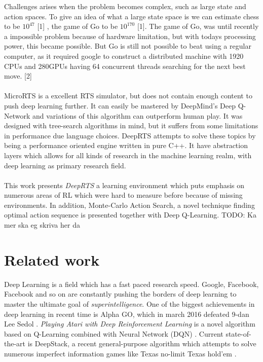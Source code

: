 \documentclass[fleqn,10pt]{article} %
\newcommand{\todo}[1]{}
\renewcommand{\todo}[1]{{\color{red} TODO: {#1}}}
\begin{document}
Challenges arises when the problem becomes complex, such as large state and action spaces. To give an idea of what a large state space is we can estimate chess to be $10^{47}$ [1] , the game of Go to be $10^{170}$ [1]. The game of Go, was until recently a impossible problem because of hardware limitation, but with todays processing power, this became possible. But Go is still not possible to beat using a regular computer, as it required google to construct a distributed machine with 1920 CPUs and 280GPUs having 64 concurrent threads  searching for the next best move. [2]
\\
\\
MicroRTS is a excellent RTS simulator, but does not contain enough content to push deep learning further. It can easily be mastered by DeepMind's Deep Q-Network and variations of this algorithm can outperform human play. It was designed with tree-search algorithms in mind, but it suffers from some limitations in performance due language choices. DeepRTS attempts to solve these topics by being a performance oriented engine written in pure C++. It have abstraction layers which allows for all kinds of research in the machine learning realm, with deep learning as primary research field.
\\
\\
This work presents \textit{DeepRTS} a learning environment which puts emphasis on numerous areas of RL which were hard to measure before because of missing environments. In addition, Monte-Carlo Action Search, a novel technique finding optimal action sequence is presented together with Deep Q-Learning.
 \todo{Ka mer ska eg skriva her da}
\section{Related work} %




Deep Learning is a field which has a fast paced research speed. Google, Facebook, Facebook and so on are constantly pushing the borders of deep learning to master the ultimate goal of \textit{superintelligence}. One of the biggest achievements in deep learning in recent time is Alpha GO, which in march 2016 defeated 9-dan Lee Sedol \cite{Silver_2016}. \textit{Playing Atari with Deep Reinforcement Learning} is a novel algorithm based on Q-Learning combined with Neural Network (DQN) \cite{DBLP:journals/corr/MnihKSGAWR13}. Current state-of-the-art is DeepStack, a recent general-purpose algorithm which attempts to solve numerous imperfect information games like Texas no-limit Texas hold’em \cite{DBLP:journals/corr/MoravcikSBLMBDW17}.
\end{document}
